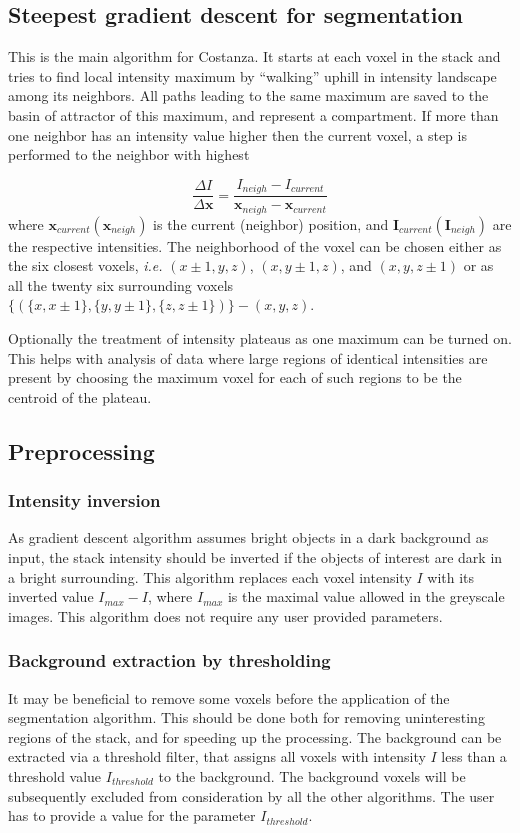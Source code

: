 \documentclass[a4paper,12pt]{article}
\begin{document}
\subsection{Steepest gradient descent for segmentation}
This is the main algorithm for Costanza. It starts at each voxel in the stack
and tries to find local intensity maximum by ``walking'' uphill in intensity landscape
among its neighbors. All paths leading to the same maximum are saved to the
basin of attractor of this maximum, and represent a compartment. If more than one neighbor
has an intensity value higher then the current voxel, a step is performed to
the neighbor with highest

\begin{equation}
\frac{\Delta I}{\Delta \mathbf{x}} =
\frac{I_{neigh}-I_{current}}{\mathbf{x}_{neigh}-\mathbf{x}_{current}}
\end{equation}
where $\mathbf{x}_{current}(\mathbf{x}_{neigh})$ is the current (neighbor)
position, and $\mathbf{I}_{current}(\mathbf{I}_{neigh})$ are the respective intensities.
The neighborhood of the voxel can be chosen either as the six closest voxels, 	\textit{i.e.}
$(x\pm1,y,z)$, $(x,y\pm1,z)$, and $(x,y,z\pm1)$ or as all the twenty six surrounding voxels $\{(\{x,x\pm1\},\{y,y\pm1\},\{z,z\pm1\})\}-(x,y,z)$.

Optionally the treatment of intensity plateaus as one maximum can be turned on. This helps with analysis of data where large regions of identical intensities are present by choosing the maximum voxel for each of such regions to be the centroid of the plateau. 

\subsection{Preprocessing}
\subsubsection{Intensity inversion}
As gradient descent algorithm assumes bright objects in a dark background as input, the stack intensity should be inverted if the objects of interest are dark in a bright surrounding. This
algorithm replaces each voxel intensity $I$ with its inverted value
$I_{max}-I$, where $I_{max}$ is the maximal value allowed in the
greyscale images. This algorithm does not require any user provided
parameters.

\subsubsection{Background extraction by thresholding}
It may be beneficial to remove some voxels before the application of the
segmentation algorithm. This should be done both for removing uninteresting regions of the
stack, and for speeding up the processing. The background can be
extracted via a threshold filter, that assigns all voxels with
intensity $I$ less than a threshold value $I_{threshold}$ to
the background. The background voxels will be subsequently excluded from consideration by all the other algorithms. The user
has to provide a value for the parameter $I_{threshold}$.
\end{document}
